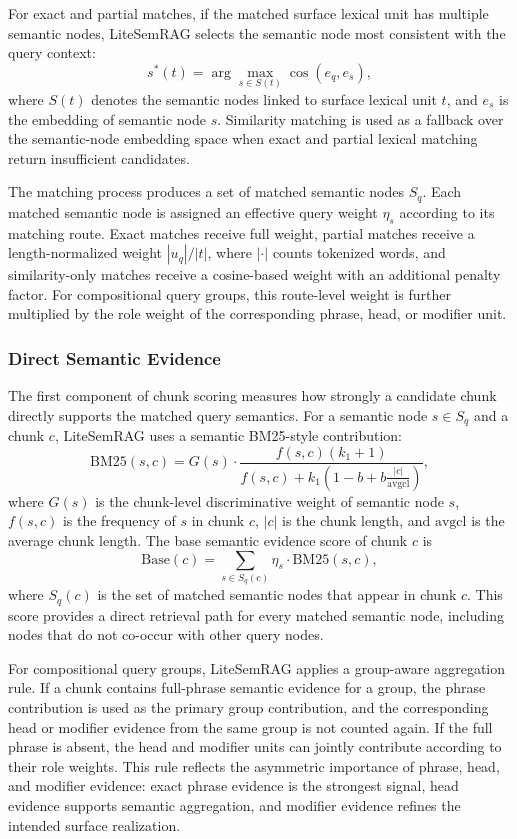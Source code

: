 \documentclass[conference]{IEEEtran}
\begin{document}
For exact and partial matches, if the matched surface lexical unit has multiple semantic nodes, LiteSemRAG selects the semantic node most consistent with the query context:
\[
s^*(t) = \arg\max_{s \in S(t)} \cos(e_q, e_s),
\]
where $S(t)$ denotes the semantic nodes linked to surface lexical unit $t$, and $e_s$ is the embedding of semantic node $s$. Similarity matching is used as a fallback over the semantic-node embedding space when exact and partial lexical matching return insufficient candidates.

The matching process produces a set of matched semantic nodes $S_q$. Each matched semantic node is assigned an effective query weight $\eta_s$ according to its matching route. Exact matches receive full weight, partial matches receive a length-normalized weight $|u_q|/|t|$, where $|\cdot|$ counts tokenized words, and similarity-only matches receive a cosine-based weight with an additional penalty factor. For compositional query groups, this route-level weight is further multiplied by the role weight of the corresponding phrase, head, or modifier unit.

\subsubsection{Direct Semantic Evidence}

The first component of chunk scoring measures how strongly a candidate chunk directly supports the matched query semantics. For a semantic node $s \in S_q$ and a chunk $c$, LiteSemRAG uses a semantic BM25-style contribution:
\[
\mathrm{BM25}(s,c) =
G(s)
\cdot
\frac{f(s,c)(k_1+1)}
{f(s,c)+k_1\left(1-b+b\frac{|c|}{\mathrm{avgcl}}\right)},
\]
where $G(s)$ is the chunk-level discriminative weight of semantic node $s$, $f(s,c)$ is the frequency of $s$ in chunk $c$, $|c|$ is the chunk length, and $\mathrm{avgcl}$ is the average chunk length. The base semantic evidence score of chunk $c$ is
\[
\mathrm{Base}(c)
=
\sum_{s \in S_q(c)}
\eta_s \cdot \mathrm{BM25}(s,c),
\]
where $S_q(c)$ is the set of matched semantic nodes that appear in chunk $c$. This score provides a direct retrieval path for every matched semantic node, including nodes that do not co-occur with other query nodes.

For compositional query groups, LiteSemRAG applies a group-aware aggregation rule. If a chunk contains full-phrase semantic evidence for a group, the phrase contribution is used as the primary group contribution, and the corresponding head or modifier evidence from the same group is not counted again. If the full phrase is absent, the head and modifier units can jointly contribute according to their role weights. This rule reflects the asymmetric importance of phrase, head, and modifier evidence: exact phrase evidence is the strongest signal, head evidence supports semantic aggregation, and modifier evidence refines the intended surface realization.
\end{document}
